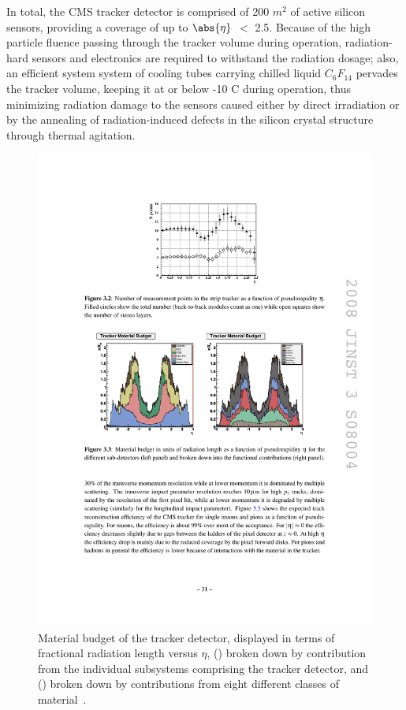 In total, the CMS tracker detector is comprised of 200 $m^{2}$ of active silicon sensors, providing a coverage of up to $\abs{\eta}$ $<$ 2.5. Because of the high particle fluence passing through the tracker volume during operation, radiation-hard sensors and electronics are required to withstand the radiation dosage; also, an efficient system system of cooling tubes carrying chilled liquid $C_{6}F_{14}$ pervades the tracker volume, keeping it at or below -10 C during operation, thus minimizing radiation damage to the sensors caused either by direct irradiation or by the annealing of radiation-induced defects in the silicon crystal structure through thermal agitation.

\begin{figure}[hbtp]
  \begin{center}
    \includegraphics[width=2.4\cmsFigWidth]{figures/cms-tracker-matbudg}
    \caption{Material budget of the tracker detector, displayed in terms of fractional radiation length versus $\eta$, (\cmsLeft) broken down by contribution from the individual subsystems comprising the tracker detector, and (\cmsRight) broken down by contributions from eight different classes of material~\cite{Dominguez:1481838}.}
    \label{fig:cms-tracker-matbudg}
  \end{center}
\end{figure}


